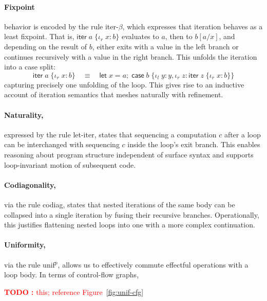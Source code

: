 \documentclass[acmsmall,screen,review]{acmart}
\newcounter{todos}
\newcommand{\TODO}[1]{{
  \stepcounter{todos}
  \begin{center}\large{\textcolor{red}{\textbf{TODO \arabic{todos}:} #1}}\end{center}
}}
\newcommand{\ms}[1]{\ensuremath{\mathsf{#1}}}
\newcommand{\lto}{:}
\newcommand{\linl}[1]{\iota_l\;{#1}}
\newcommand{\linr}[1]{\iota_r\;{#1}}
\newcommand{\letexpr}[3]{\ensuremath{\ms{let}\;#1 = #2;\;#3}}
\newcommand{\caseexpr}[5]{\ms{case}\;#1\;\{\linl{#2} \lto #3, \linr{#4} \lto #5\}}
\newcommand{\liter}[3]{\ms{iter}\;#1\;\{ \linr{#2} \lto #3 \}}
\newcommand{\tref}{\twoheadrightarrow}
\newcommand{\antitref}{\twoheadleftarrow}
\begin{document}
\paragraph{Fixpoint} behavior is encoded by the rule \textsf{iter-$\beta$}, which expresses that
iteration behaves as a least fixpoint. That is, $\liter{a}{x}{b}$ evaluates to $a$, then to
$b[a/x]$, and depending on the result of $b$, either exits with a value in the left branch or
continues recursively with a value in the right branch. This unfolds the iteration into a case
split:
\[
\liter{a}{x}{b} \quad \equiv \quad \letexpr{x}{a}{\caseexpr{b}{y}{y}{z}{\liter{z}{x}{b}}}
\]
capturing precisely one unfolding of the loop. This gives rise to an inductive account of iteration
semantics that meshes naturally with refinement.
%
\paragraph{Naturality,} expressed by the rule \textsf{let-iter}, states that sequencing a
computation $c$ after a loop can be interchanged with sequencing $c$ inside the loop’s exit branch.
This enables reasoning about program structure independent of surface syntax and supports
loop-invariant motion of subsequent code.
%
\paragraph{Codiagonality,} via the rule \textsf{codiag}, states that nested iterations of the same
body can be collapsed into a single iteration by fusing their recursive branches. Operationally,
this justifies flattening nested loops into one with a more complex continuation.
%
\paragraph{Uniformity,} via the rule \textsf{unif$^p$}, allows us to effectively commute effectful
operations with a loop body. In terms of control-flow graphs,
\TODO{this; reference Figure~\ref{fig:unif-cfg}}

\end{document}
